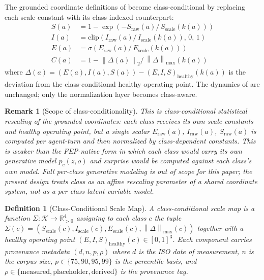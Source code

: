\documentclass[11pt,twocolumn]{article}
\newtheorem{definition}[theorem]{Definition}
\newtheorem{remark}[theorem]{Remark}
\newcommand{\R}{\mathbb{R}}
\newcommand{\norm}[1]{\left\lVert #1 \right\rVert}
\begin{document}
The grounded coordinate definitions of
become class-conditional by replacing each scale constant with its
class-indexed counterpart:
\begin{align}
  S(a) &= 1 - \exp\!\left(-S_{\text{raw}}(a) /\, S_{\text{scale}}(k(a))\right) \\
  I(a) &= \mathrm{clip}\!\left(I_{\text{raw}}(a) /\, I_{\text{scale}}(k(a)),\,0,\,1\right) \\
  E(a) &= \sigma\!\left(E_{\text{raw}}(a) /\, E_{\text{scale}}(k(a))\right) \\
  C(a) &= 1 - \norm{\Delta(a)}_2 /\, \norm{\Delta}_{\max}(k(a))
  \label{eq:class-conditional}
\end{align}
where $\Delta(a) = (E(a), I(a), S(a)) - (E,I,S)_{\text{healthy}}(k(a))$
is the deviation from the class-conditional healthy operating
point. The dynamics of  are unchanged; only the
normalization layer becomes class-aware.

\begin{remark}[Scope of class-conditionality]
\label{rem:class-scope}
This is class-conditional \emph{statistical rescaling} of the
grounded coordinates: each class receives its own scale constants
and healthy operating point, but a single scalar
$E_{\text{raw}}(a)$, $I_{\text{raw}}(a)$, $S_{\text{raw}}(a)$ is
computed per agent-turn and then normalized by class-dependent
constants. This is weaker than the FEP-native form in which each
class would carry its own generative model $p_c(z, o)$ and
surprise would be computed against each class's own model. Full
per-class generative modeling is out of scope for this paper; the
present design treats class as an affine rescaling parameter of a
shared coordinate system, not as a per-class latent-variable
model.
\end{remark}

\begin{definition}[Class-Conditional Scale Map]
\label{def:scale-map}
A class-conditional scale map is a function
$\Sigma : \mathcal{K} \to \R^4_{>0}$ assigning to each class $c$
the tuple
$\Sigma(c) = (S_{\text{scale}}(c), I_{\text{scale}}(c),
E_{\text{scale}}(c), \norm{\Delta}_{\max}(c))$
together with a healthy operating point
$(E,I,S)_{\text{healthy}}(c) \in [0,1]^3$. Each component carries
provenance metadata $(d, n, p, \rho)$ where $d$ is the ISO date of
measurement, $n$ is the corpus size, $p \in \{75, 90, 95, 99\}$ is
the percentile basis, and $\rho \in \{\text{measured}, \text{placeholder}, \text{derived}\}$
is the provenance tag.
\end{definition}
\end{document}
